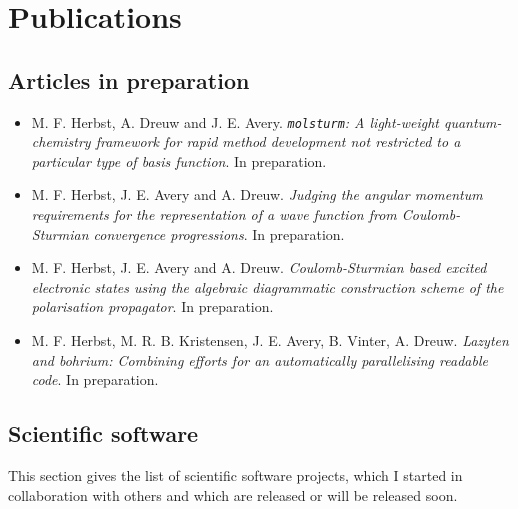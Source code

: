 \chapter*{Publications}
{}

\section*{Articles in preparation}
{}
\begin{itemize}
	\item M. F. Herbst, A. Dreuw and J. E. Avery.
		\textit{\texttt{molsturm}: A light-weight quantum-chemistry framework for rapid method development not restricted to a particular type of basis function}. In preparation.
	\item M. F. Herbst, J. E. Avery and A. Dreuw.
		\textit{Judging the angular momentum requirements for the representation of a wave function from Coulomb-Sturmian convergence progressions}. In preparation.
	\item M. F. Herbst, J. E. Avery and A. Dreuw.
		\textit{Coulomb-Sturmian based excited electronic states using the algebraic diagrammatic construction scheme of the polarisation propagator}. \linebreak In preparation.
	\item M. F. Herbst, M. R. B. Kristensen, J. E. Avery, B. Vinter, A. Dreuw.
		\textit{Lazyten and bohrium: Combining efforts for an automatically parallelising readable code}. \linebreak In preparation.
\end{itemize}


\section*{Scientific software}
{}
This section gives the list of scientific software projects,
which I started in collaboration with others
and which are released or will be released soon.

